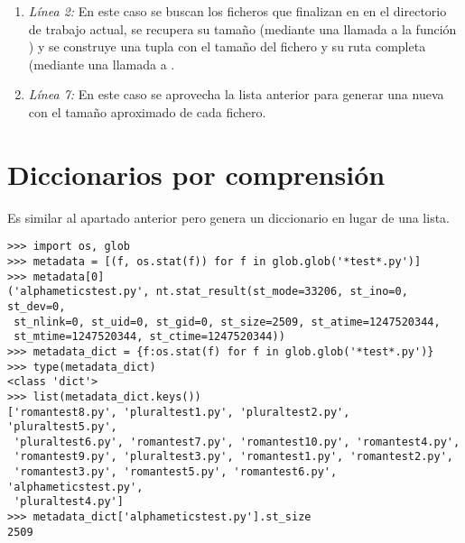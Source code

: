 \begin{enumerate}

\item \emph{Línea 2:} En este caso se buscan los ficheros que finalizan en  en el directorio de trabajo actual, se recupera su tamaño (mediante una llamada a la función ) y se construye una tupla con el tamaño del fichero y su ruta completa (mediante una llamada a .

\item \emph{Línea 7:} En este caso se aprovecha la lista anterior para generar una nueva con el tamaño aproximado de cada fichero.

\end{enumerate}
 
\section{Diccionarios por comprensión}

Es similar al apartado anterior pero genera un diccionario en lugar de una lista.

\noindent\begin{minipage}{\textwidth}
\begin{lstlisting}[mathescape=True]
>>> import os, glob
>>> metadata = [(f, os.stat(f)) for f in glob.glob('*test*.py')]
>>> metadata[0]
('alphameticstest.py', nt.stat_result(st_mode=33206, st_ino=0, st_dev=0,
 st_nlink=0, st_uid=0, st_gid=0, st_size=2509, st_atime=1247520344,
 st_mtime=1247520344, st_ctime=1247520344))
>>> metadata_dict = {f:os.stat(f) for f in glob.glob('*test*.py')}
>>> type(metadata_dict)
<class 'dict'>
>>> list(metadata_dict.keys())
['romantest8.py', 'pluraltest1.py', 'pluraltest2.py', 'pluraltest5.py',
 'pluraltest6.py', 'romantest7.py', 'romantest10.py', 'romantest4.py',
 'romantest9.py', 'pluraltest3.py', 'romantest1.py', 'romantest2.py',
 'romantest3.py', 'romantest5.py', 'romantest6.py', 'alphameticstest.py',
 'pluraltest4.py']
>>> metadata_dict['alphameticstest.py'].st_size
2509
\end{lstlisting}
\end{minipage}

